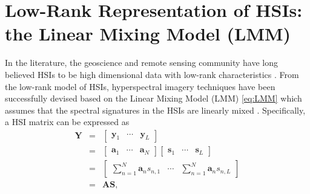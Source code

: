 \section{Low-Rank Representation of HSIs: the Linear Mixing Model (LMM)}
In the literature, the geoscience and remote sensing community have long
believed HSIs to be high dimensional data with low-rank characteristics
\cite{INTERPRET_RESIDUAL_IMG_SPECTRAL_MIXTURE_ANALYSIS_OF_AVIRIS_IMG,
      BLIND_HU_BY_EXTENDED_LMM,
      CONSTRAINED_SUBPIXEL_TARGET_DETECT_FOR_HSI,
      CONVEX_FORMULATION_HSR_VIA_SUBSPACE_REGULAR,
      DENOIS_HSI_BY_LOWRANK_REPRESENT,
      DISTRIBUT_BLIND_HU_VIA_JOINT_SPARS_LOWRANK_NMF,
      FULLY_CONSTRAINED_LS_LINEAR_SPECTRAL_MIXTURE_ANALYSIS,
      FUMI,
      FUSE,
      HALS_RANK2NMF,
      HSI_RESOTRE_LOWRANK_REPRESENT_SPECTRAL_DIFF_IMG,
      HSI_RESTORE_LOWRANK_MATRIX_RECOVER,
      HSR_BY_JOINTCRITERION_NMF,
      HYSIME,
      JOINT_HSR_AND_HU_INTERACTIVE_FEEDBACK,
      LINEAR_SPECTRAL_RANDOM_MIXTURE_ANALYSIS_FOR_HSI,
      LOWRANK_SUBSPACE_REPRESENT_ESTIMATE_NO_OF_SIGNAL_HSI,
      MVES,
      SNNMF}.
From the low-rank model of HSIs, hyperspectral imagery techniques have been
successfully devised based on the Linear Mixing Model (LMM) \eqref{eq:LMM}
which assumes that the spectral signatures in the HSIs are linearly mixed
\cite{INTERPRET_RESIDUAL_IMG_SPECTRAL_MIXTURE_ANALYSIS_OF_AVIRIS_IMG,
      BLIND_HU_BY_EXTENDED_LMM,
      CNMF,
      CONSTRAINED_SUBPIXEL_TARGET_DETECT_FOR_HSI,
      CONVEX_FORMULATION_HSR_VIA_SUBSPACE_REGULAR,
      DENOIS_HSI_BY_LOWRANK_REPRESENT,
      DISTRIBUT_BLIND_HU_VIA_JOINT_SPARS_LOWRANK_NMF,
      FULLY_CONSTRAINED_LS_LINEAR_SPECTRAL_MIXTURE_ANALYSIS,
      FUMI,
      FUSE,
      HALS_RANK2NMF,
      HSR_BY_JOINTCRITERION_NMF,
      HYSIME,
      ICE,
      JOINT_HSR_AND_HU_INTERACTIVE_FEEDBACK,
      LINEAR_SPECTRAL_RANDOM_MIXTURE_ANALYSIS_FOR_HSI,
      LOWRANK_SUBSPACE_REPRESENT_ESTIMATE_NO_OF_SIGNAL_HSI,
      MVCNMF,
      MVES,
      RVM,
      SISAL,
      SNNMF,
      VCA}.
Specifically, a HSI matrix can be expressed as
\begin{subequations}
    \begin{eqnarray}
        \bm Y & = & \begin{bmatrix} \bm y_1 & \cdots & \bm y_L \end{bmatrix} \\
              & = & \begin{bmatrix} \bm a_1 & \cdots & \bm a_N \end{bmatrix}
                    \begin{bmatrix} \bm s_1 & \cdots & \bm s_L \end{bmatrix} \\
              & = & \begin{bmatrix} \displaystyle \sum_{n=1}^N \bm a_n s_{n,1} & \cdots & \displaystyle \sum_{n=1}^N \bm a_n s_{n,L} \end{bmatrix} \\
              & = & \bm A \bm S,
    \end{eqnarray}
    \label{eq:LMM}
\end{subequations}

